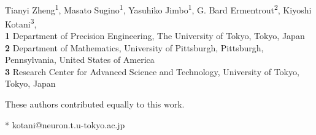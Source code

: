 \documentclass[10pt,letterpaper]{article}
\begin{document}
\vspace*{0.2in}

\begin{flushleft}
{\Large
\textbf{} %
}
\newline
\\
Tianyi Zheng\textsuperscript{1\Yinyang},
Masato Sugino\textsuperscript{1\Yinyang},
Yasuhiko Jimbo\textsuperscript{1},
G. Bard Ermentrout\textsuperscript{2},
Kiyoshi Kotani\textsuperscript{3},
\\
\bigskip
\textbf{1} Department of Precision Engineering, The University of Tokyo, Tokyo, Japan
\\
\textbf{2} Department of Mathematics, University of Pittsburgh, Pittsburgh, Pennsylvania, United States of America
\\
\textbf{3} Research Center for Advanced Science and Technology, University of Tokyo, Tokyo, Japan
\\
\bigskip

% 
%
\Yinyang These authors contributed equally to this work.

* kotani@neuron.t.u-tokyo.ac.jp

\end{flushleft}
\end{document}
